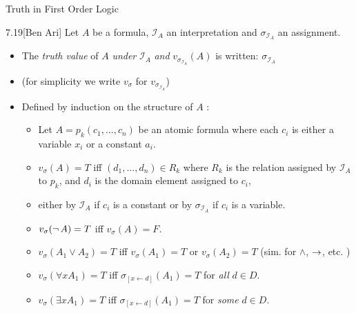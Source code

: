 \documentclass[style=sailor,size=12pt]{powerdot}
\begin{document}
\begin{wideslide}[bm=,toc=]{Truth in First Order Logic}
\begin{defn}{7.19}[Ben Ari] Let $A$ be a formula, $\mathcal{I}_A$ an interpretation and
$\sigma_{\mathcal{I}_A}$ an assignment. 
\begin{itemize}
\item<2-> The \emph{truth value} of $A$ \emph{under} $\mathcal{I}_A$ \emph{and}
$v_{\sigma_{\mathcal{I}_A}}(A)$ is written: $\sigma_{\mathcal{I}_A}$
\item<3-> (for simplicity we write $v_{\sigma}$ for $v_{\sigma_{\mathcal{I}_A}}$)
\item<4-> Defined by induction on the structure of $A$ :
\begin{itemize}
\item<5->  Let $A = p_k(c_1,...,c_n)$ be an atomic formula where each $c_i$ is
either a variable $x_i$ or a constant $a_i$. 
\item<6->  $v_{\sigma}(A) = T$ iff $(d_1,...,d_n)
\in R_k$ where $R_k$ is the relation assigned by $\mathcal{I}_A$ to $p_k$, and
$d_i$ is the domain element assigned to $c_i$, 
\item<7->  either by $\mathcal{I}_A$ if $c_i$ is a constant or by $\sigma_{\mathcal{I}_A}$ 
      if $c_i$ is a variable.
\item<8-> $v_{\sigma}(\mathop{\neg} A) = T$ iff $v_{\sigma}(A) = F$.
\item<9-> $v_{\sigma}(A_1 \lor A_2) = T$ iff $v_{\sigma}(A_1) = T$ or
$v_{\sigma}(A_2) = T$ (sim. for $\land$, $\mathbin{\rightarrow}$, etc. ) 
\item<10->  $v_{\sigma}(\forall x A_1) = T$ iff $\sigma_{[x \leftarrow d]}(A_1) = T$
for \emph{all} $d \in D$.
\item<11->  $v_{\sigma}(\exists x A_1) = T$ iff $\sigma_{[x \leftarrow d]}(A_1) = T$
for \emph{some} $d \in D$.
\end{itemize}
\end{itemize}
\end{defn}
\end{wideslide}
\end{document}

